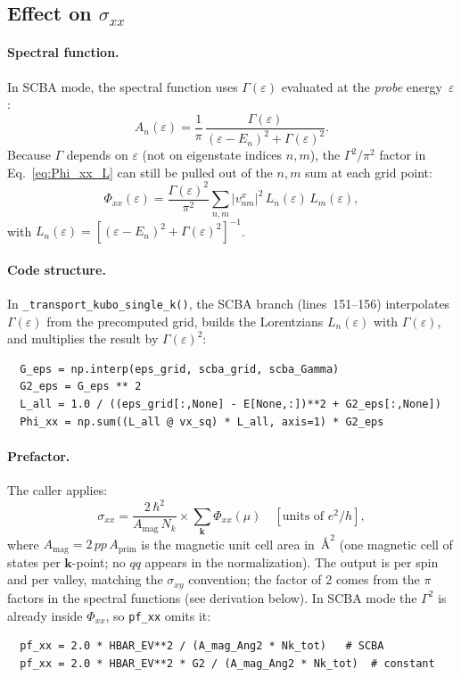 \documentclass[11pt]{article}
\newcommand{\Gam}{\Gamma}
\newcommand{\eps}{\varepsilon}
\newcommand{\Nk}{N_k}
\newcommand{\Ang}{\text{\AA}}
\begin{document}
\subsection{Effect on $\sigma_{xx}$}

\paragraph{Spectral function.}  In SCBA mode, the spectral function
uses $\Gam(\eps)$ evaluated at the \emph{probe} energy~$\eps$:
\begin{equation}
  A_n(\eps) = \frac{1}{\pi}\,
  \frac{\Gam(\eps)}{(\eps - E_n)^2 + \Gam(\eps)^2}.
\end{equation}
Because $\Gam$ depends on $\eps$ (not on eigenstate indices $n,m$),
the $\Gam^2/\pi^2$ factor in Eq.~\eqref{eq:Phi_xx_L} can still be
pulled out of the $n,m$ sum at each grid point:
\begin{equation}
  \Phi_{xx}(\eps) = \frac{\Gam(\eps)^2}{\pi^2}
  \sum_{n,m} |v^x_{nm}|^2\, L_n(\eps)\, L_m(\eps),
\end{equation}
with $L_n(\eps) = [(\eps - E_n)^2 + \Gam(\eps)^2]^{-1}$.

\paragraph{Code structure.}  In \texttt{\_transport\_kubo\_single\_k()},
the SCBA branch (lines~151--156) interpolates $\Gam(\eps)$ from the
precomputed grid, builds the Lorentzians $L_n(\eps)$ with
$\Gam(\eps)$, and multiplies the result by $\Gam(\eps)^2$:
\begin{verbatim}
  G_eps = np.interp(eps_grid, scba_grid, scba_Gamma)
  G2_eps = G_eps ** 2
  L_all = 1.0 / ((eps_grid[:,None] - E[None,:])**2 + G2_eps[:,None])
  Phi_xx = np.sum((L_all @ vx_sq) * L_all, axis=1) * G2_eps
\end{verbatim}

\paragraph{Prefactor.}  The caller applies:
\begin{equation}
  \sigma_{xx} = \frac{2\,\hbar^2}{A_{\mathrm{mag}}\,\Nk}
  \times \sum_\mathbf{k} \Phi_{xx}(\mu) \quad
  [\text{units of } e^2/h],
\end{equation}
where $A_{\mathrm{mag}} = 2\,pp\,A_{\mathrm{prim}}$ is the magnetic
unit cell area in~$\Ang^2$ (one magnetic cell of states per
$\mathbf{k}$-point; no $qq$ appears in the normalization).  The
output is per spin and per valley, matching the $\sigma_{xy}$
convention; the factor of 2 comes from the $\pi$ factors in the
spectral functions (see derivation below).  In SCBA mode the $\Gam^2$
is already inside $\Phi_{xx}$, so \texttt{pf\_xx} omits it:
\begin{verbatim}
  pf_xx = 2.0 * HBAR_EV**2 / (A_mag_Ang2 * Nk_tot)   # SCBA
  pf_xx = 2.0 * HBAR_EV**2 * G2 / (A_mag_Ang2 * Nk_tot)  # constant
\end{verbatim}
\end{document}
